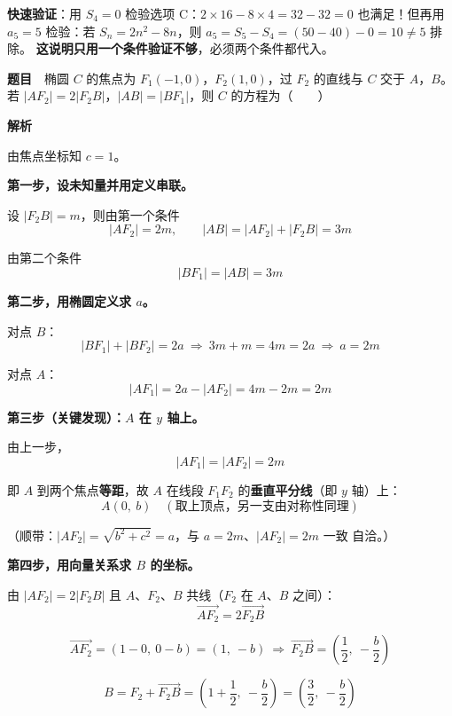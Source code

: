 
\begin{gktip}
\textbf{快速验证}：用 $S_4=0$ 检验选项 C：$2\times16-8\times4=32-32=0$  也满足！但再用 $a_5=5$ 检验：若 $S_n=2n^{2}-8n$，则 $a_5=S_5-S_4=(50-40)-0=10\ne5$  排除。
\textbf{这说明只用一个条件验证不够}，必须两个条件都代入。
\end{gktip}

\par\medskip


\textbf{题目}　椭圆 $C$ 的焦点为 $F_1(-1,0)$，$F_2(1,0)$，过 $F_2$ 的直线与 $C$ 交于 $A$，$B$。若 $\left|AF_2\right|=2\left|F_2B\right|$，$|AB|=\left|BF_1\right|$，则 $C$ 的方程为（　　）

\textbf{解析}

由焦点坐标知 $c=1$。

\textbf{第一步，设未知量并用定义串联。}

设 $\left|F_2B\right|=m$，则由第一个条件
\[\left|AF_2\right|=2m,\qquad |AB|=\left|AF_2\right|+\left|F_2B\right|=3m\]

由第二个条件
\[\left|BF_1\right|=|AB|=3m\]

\textbf{第二步，用椭圆定义求 $a$。}

对点 $B$：
\[\left|BF_1\right|+\left|BF_2\right|=2a\ \Longrightarrow\ 3m+m=4m=2a\ \Longrightarrow\ a=2m\]

对点 $A$：
\[\left|AF_1\right|=2a-\left|AF_2\right|=4m-2m=2m\]

\textbf{第三步（关键发现）：$A$ 在 $y$ 轴上。}

由上一步，
\[\left|AF_1\right|=\left|AF_2\right|=2m\]

即 $A$ 到两个焦点\textbf{等距}，故 $A$ 在线段 $F_1F_2$ 的\textbf{垂直平分线}（即 $y$ 轴）上：
\[A(0,\ b)\quad(\text{取上顶点，另一支由对称性同理})\]

（顺带：$\left|AF_2\right|=\sqrt{b^{2}+c^{2}}=a$，与 $a=2m$、$\left|AF_2\right|=2m$ 一致  自洽。）

\textbf{第四步，用向量关系求 $B$ 的坐标。}

由 $\left|AF_2\right|=2\left|F_2B\right|$ 且 $A$、$F_2$、$B$ 共线（$F_2$ 在 $A$、$B$ 之间）：
\[\overrightarrow{AF_2}=2\overrightarrow{F_2B}\]

\[\overrightarrow{AF_2}=(1-0,\ 0-b)=(1,\ -b)\ \Longrightarrow\ \overrightarrow{F_2B}=\left(\frac12,\ -\frac b2\right)\]

\[B=F_2+\overrightarrow{F_2B}=\left(1+\frac12,\ -\frac b2\right)=\left(\frac32,\ -\frac b2\right)\]

